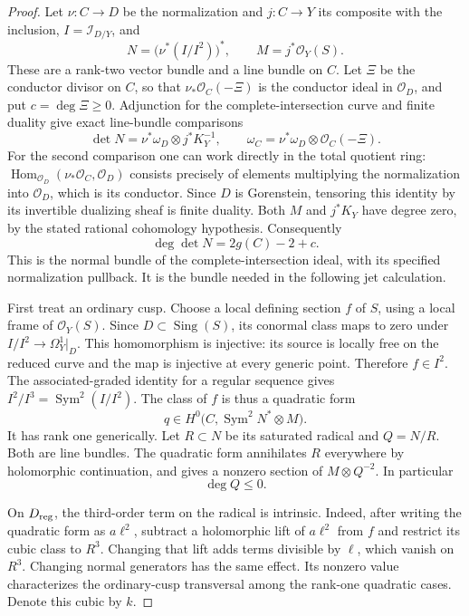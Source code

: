 \begin{proof}
Let $\nu:C\to D$ be the normalization and $j:C\to Y$
its composite with the inclusion,
$I=\mathcal I_{D/Y}$, and
\[
 N=\bigl(\nu^*(I/I^2)\bigr)^*,\qquad
 M=j^*\mathcal O_Y(S).
\]
These are a rank-two vector bundle and a line bundle on $C$.
Let $\Xi$ be the conductor divisor on $C$, so that
$\nu_*\mathcal O_C(-\Xi)$ is the conductor ideal in
$\mathcal O_D$, and put $c=\deg\Xi\geq0$.
Adjunction for the complete-intersection curve and finite
duality give exact line-bundle comparisons
\[
 \det N=\nu^*\omega_D\otimes j^*K_Y^{-1},\qquad
 \omega_C=\nu^*\omega_D\otimes\mathcal O_C(-\Xi).
                                                        \tag{A.J.1}
\]
For the second comparison one can work directly in the total
quotient ring: $\operatorname{Hom}_{\mathcal O_D}
(\nu_*\mathcal O_C,\mathcal O_D)$ consists precisely of
elements multiplying the normalization into $\mathcal O_D$,
which is its conductor. Since $D$ is Gorenstein, tensoring
this identity by its invertible dualizing sheaf is finite
duality. Both $M$ and $j^*K_Y$ have degree zero, by the
stated rational cohomology hypothesis. Consequently
\[
 \deg\det N=2g(C)-2+c.                              \tag{A.J.2}
\]
This is the normal bundle of the complete-intersection ideal,
with its specified normalization pullback. It is the bundle
needed in the following jet calculation.

First treat an ordinary cusp. Choose a local defining section
$f$ of $S$, using a local frame of $\mathcal O_Y(S)$.
Since $D\subset\operatorname{Sing}(S)$, its conormal class
maps to zero under
$I/I^2\to\Omega_Y^1|_D$. This homomorphism is injective:
its source is locally free on the reduced curve and the map
is injective at every generic point. Therefore $f\in I^2$.
The associated-graded identity for a regular sequence gives
$I^2/I^3=\operatorname{Sym}^2(I/I^2)$. The class of $f$
is thus a quadratic form
\[
 q\in H^0\bigl(C,\operatorname{Sym}^2N^*\otimes M\bigr).
\]
It has rank one generically. Let $R\subset N$ be its
saturated radical and $Q=N/R$. Both are line bundles.
The quadratic form annihilates $R$ everywhere by holomorphic
continuation, and gives a nonzero section of $M\otimes Q^{-2}$.
In particular
\[
 \deg Q\leq0.                                      \tag{A.J.3}
\]

On $D_{\rm reg}$, the third-order term on the radical is
intrinsic. Indeed, after writing the quadratic form as
$a\ell^2$, subtract a holomorphic lift of $a\ell^2$ from
$f$ and restrict its cubic class to $R^3$. Changing that lift
adds terms divisible by $\ell$, which vanish on $R^3$.
Changing normal generators has the same effect. Its nonzero
value characterizes the ordinary-cusp transversal among the
rank-one quadratic cases. Denote this cubic by $k$.


\end{proof}
